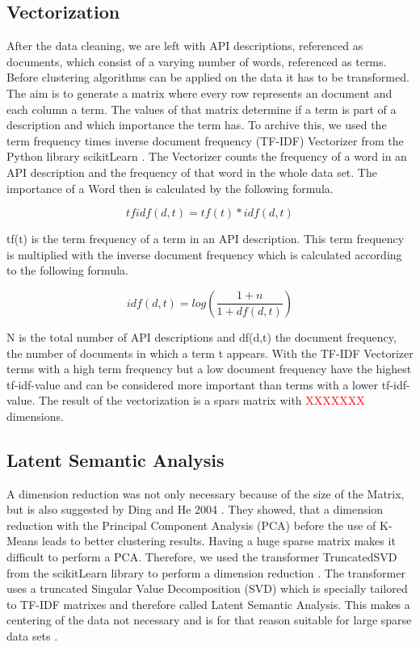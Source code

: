 \documentclass[a4paper]{IEEEtran}
\begin{document}
\subsection{Vectorization}
After the data cleaning, we are left with API descriptions, referenced as documents, which consist of a varying number of words, referenced as terms. Before clustering algorithms can be applied on the data it has to be transformed. The aim is to generate a matrix where every row represents an document and each column a term. The values of that matrix determine if a term is part of a description and which importance the term has. To archive this, we used the term frequency times inverse document frequency (TF-IDF) Vectorizer from the Python library scikitLearn \cite{scikit-learn}. The Vectorizer counts the frequency of a word in an API description and the frequency of that word in the whole data set. The importance of a Word then is calculated by the following formula.

\begin{equation*}
tfidf (d,t) = tf(t) * idf(d,t) 
\end{equation*}

tf(t) is the term frequency of a term in an API description. This term frequency is multiplied with the inverse document frequency which is calculated according to the following formula.

\begin{equation*}
idf (d,t) = log\left( \frac{1+n}{1+df(d,t)} \right)
\end{equation*}

N is the total number of API descriptions and df(d,t) the document frequency, the number of documents in which a term t appears. 
With the TF-IDF Vectorizer terms with a high term frequency but a low document frequency have the highest tf-idf-value and can be considered more important than terms with a lower tf-idf-value. The result of the vectorization is a spars matrix with \textcolor{red} {XXXXXXX} dimensions.

\subsection{Latent Semantic Analysis}
A dimension reduction was not only necessary because of the size of the Matrix, but is also suggested by Ding and He 2004 \cite{ding2004k}. They showed, that a dimension reduction with the Principal Component Analysis (PCA) before the use of K-Means leads to better clustering  results. Having a huge sparse matrix makes it difficult to perform a PCA. Therefore, we used the transformer TruncatedSVD from the scikitLearn library to perform a dimension reduction \cite{scikit-learn}. The transformer uses a truncated Singular Value Decomposition (SVD) which is specially tailored to TF-IDF matrixes and therefore called Latent Semantic Analysis. This makes a centering of the data not necessary and is for that reason suitable for large sparse data sets \cite{albright2004taming}.
\end{document}
